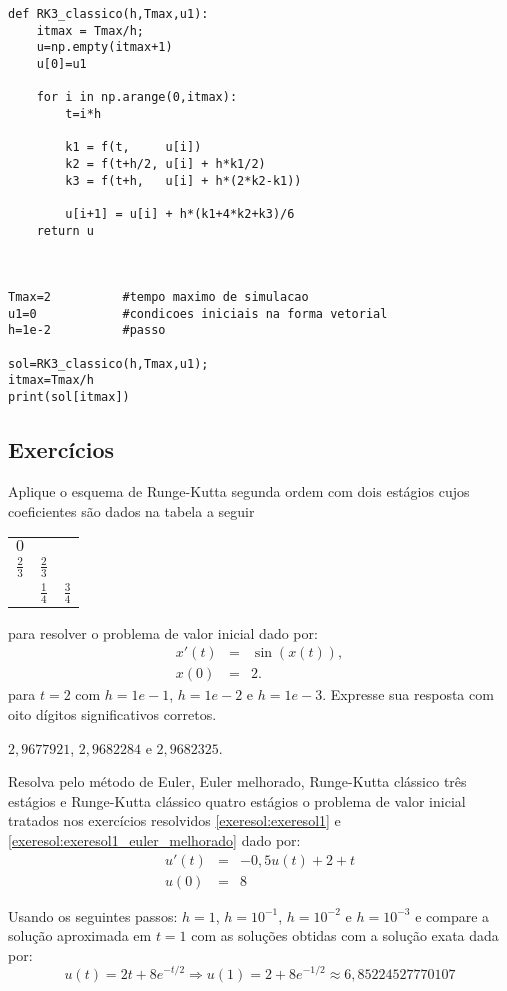 \begin{exeresol}
\begin{verbatim}
def RK3_classico(h,Tmax,u1):
  	itmax = Tmax/h;
	u=np.empty(itmax+1)
	u[0]=u1

	for i in np.arange(0,itmax):
		t=i*h

		k1 = f(t,     u[i])
		k2 = f(t+h/2, u[i] + h*k1/2)
		k3 = f(t+h,   u[i] + h*(2*k2-k1))

		u[i+1] = u[i] + h*(k1+4*k2+k3)/6
	return u



Tmax=2			#tempo maximo de simulacao
u1=0			#condicoes iniciais na forma vetorial
h=1e-2			#passo

sol=RK3_classico(h,Tmax,u1);
itmax=Tmax/h
print(sol[itmax])
\end{verbatim}

\fi

\end{exeresol}

\subsection*{Exercícios}
\begin{exer} Aplique o esquema de Runge-Kutta segunda ordem com dois estágios cujos coeficientes são dados na tabela a seguir
 \begin{tabular}{c|cc}
  $0$ &   &   \\
  $\frac{2}{3}$ & $\frac{2}{3}$ &   \\  \hline
    & $\frac{1}{4}$ & $\frac{3}{4}$
\end{tabular}
para resolver o problema de valor inicial dado por:
\begin{eqnarray}
x'(t)&=&\sin(x(t)),\\
x(0)&=&2.
\end{eqnarray}
para $t=2$ com $h=1e-1$, $h=1e-2$ e $h=1e-3$. Expresse sua resposta com oito dígitos significativos corretos.
\end{exer}
\begin{resp}
 $2,9677921$, $2,9682284$ e $2,9682325$.
\end{resp}


\begin{exer}Resolva pelo método de Euler, Euler melhorado, Runge-Kutta clássico três estágios e Runge-Kutta clássico quatro estágios o problema de valor inicial tratados nos  exercícios resolvidos \ref{exeresol:exeresol1} e \ref{exeresol:exeresol1_euler_melhorado} dado por:
\begin{eqnarray}
     u'(t)&=& -0,5u(t)+2+t\\
            u(0) &=&  8
\end{eqnarray}

Usando os seguintes passos: $h=1$, $h=10^{-1}$, $h=10^{-2}$ e $h=10^{-3}$ e compare a solução aproximada em $t=1$ com as soluções obtidas com a solução exata dada por:
\begin{equation}
     u(t) = 2t+8e^{-t/2} \Longrightarrow u(1)=2+8e^{-1/2} \approx 6,85224527770107
\end{equation}
\end{exer}

